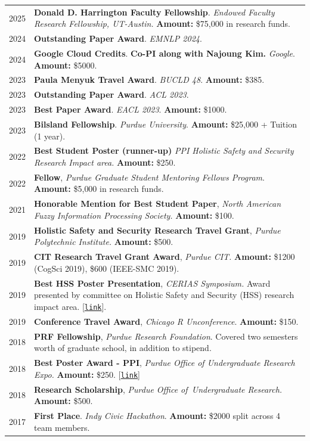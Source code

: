 \documentclass[11pt]{article}
\newcommand{\link}[1]{[\href{#1}{\texttt{link}}]}
\begin{document}
\begin{longtable}{p{}  p{} }
2025 & \textbf{Donald D. Harrington Faculty Fellowship}. \textit{Endowed Faculty Research Fellowship, UT-Austin.} \textbf{Amount:} \$75,000 in research funds.\\
2024 & \textbf{Outstanding Paper Award}. \textit{EMNLP 2024}.\\
2024 & \textbf{Google Cloud Credits}. \textbf{Co-PI along with Najoung Kim.} \textit{Google}. \textbf{Amount:} \$5000.\\
2023 & \textbf{Paula Menyuk Travel Award}. \textit{BUCLD 48}. \textbf{Amount:} \$385.\\
2023 & \textbf{Outstanding Paper Award}. \textit{ACL 2023}.\\
2023 & \textbf{Best Paper Award}. \textit{EACL 2023}. \textbf{Amount:} \$1000.\\
2023 & \textbf{Bilsland Fellowship}. \textit{Purdue University}. \textbf{Amount:} \$25{,}000 + Tuition (1 year).\\
2022 & \textbf{Best Student Poster (runner-up)} \textit{PPI Holistic Safety and Security Research Impact area.} \textbf{Amount:} \$250.\\
2022 & \textbf{Fellow}, \textit{Purdue Graduate Student Mentoring Fellows Program}. \textbf{Amount:} \$5{,}000 in research funds.\\
2021 & \textbf{Honorable Mention for Best Student Paper}, \textit{North American Fuzzy Information Processing Society.} \textbf{Amount:} \$100.\\
2019 & \textbf{Holistic Safety and Security Research Travel Grant}, \textit{Purdue Polytechnic Institute.} \textbf{Amount:} \$500.\\
2019 & \textbf{CIT Research Travel Grant Award}, \textit{Purdue CIT.} \textbf{Amount:} \$1200 (CogSci 2019), \$600 (IEEE-SMC 2019).\\
2019 & \textbf{Best HSS Poster Presentation}, \textit{CERIAS Symposium.} Award presented by committee on Holistic Safety and Security (HSS) research impact area. \link{https://polytechnic.purdue.edu/office-of-research/impact-areas/holistic-safety-and-security/cerias-poster-session}.\\
2019 & \textbf{Conference Travel Award}, \textit{Chicago R Unconference}. \textbf{Amount:} \$150.\\
2018 & \textbf{PRF Fellowship}, \textit{Purdue Research Foundation}. Covered two semesters worth of graduate school, in addition to stipend.\\
2018 & \textbf{Best Poster Award - PPI}, \textit{Purdue Office of Undergraduate Research Expo.} \textbf{Amount:} \$250. \link{https://www.purdue.edu/undergrad-research/conferences/spring/archive/past-winners.php}\\
2018 & \textbf{Research Scholarship}, \textit{Purdue Office of~Undergraduate Research.} \textbf{Amount:} \$500.\\
2017 & \textbf{First Place}. \textit{Indy Civic Hackathon}. \textbf{Amount:} \$2000 split across 4 team members.
\end{longtable}
\end{document}
